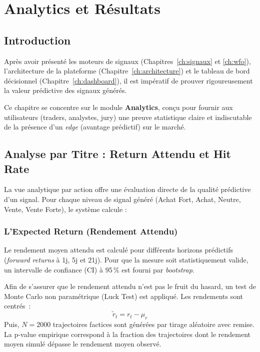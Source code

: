 \chapter{Analytics et Résultats}
\label{ch:analytics}

\section{Introduction}
\label{sec:intro_analytics}

Après avoir présenté les moteurs de signaux (Chapitres~\ref{ch:signaux} et \ref{ch:wfo}),
l'architecture de la plateforme (Chapitre~\ref{ch:architecture}) et le tableau de bord
décisionnel (Chapitre~\ref{ch:dashboard}), il est impératif de prouver rigoureusement
la valeur prédictive des signaux générés.

Ce chapitre se concentre sur le module \textbf{Analytics}, conçu pour fournir aux
utilisateurs (traders, analystes, jury) une preuve statistique claire et indiscutable
de la présence d'un \textit{edge} (avantage prédictif) sur le marché.

\section{Analyse par Titre : Return Attendu et Hit Rate}

La vue analytique par action offre une évaluation directe de la qualité prédictive
d'un signal. Pour chaque niveau de signal généré (Achat Fort, Achat, Neutre, Vente, Vente Forte),
le système calcule :

\subsection{L'Expected Return (Rendement Attendu)}
Le rendement moyen attendu est calculé pour différents horizons prédictifs
(\textit{forward returns} à 1j, 5j et 21j). Pour que la mesure soit statistiquement
valide, un intervalle de confiance (CI) à 95\,\% est fourni par \textit{bootstrap}.

Afin de s'assurer que le rendement attendu n'est pas le fruit du hasard, un test
de Monte Carlo non paramétrique (Luck Test) est appliqué. Les rendements sont centrés~:
\begin{equation}
\tilde{r}_t = r_t - \mu_r
\end{equation}
Puis, $N=2000$ trajectoires factices sont générées par tirage aléatoire avec remise.
La p-value empirique correspond à la fraction des trajectoires dont le rendement
moyen simulé dépasse le rendement moyen observé.

